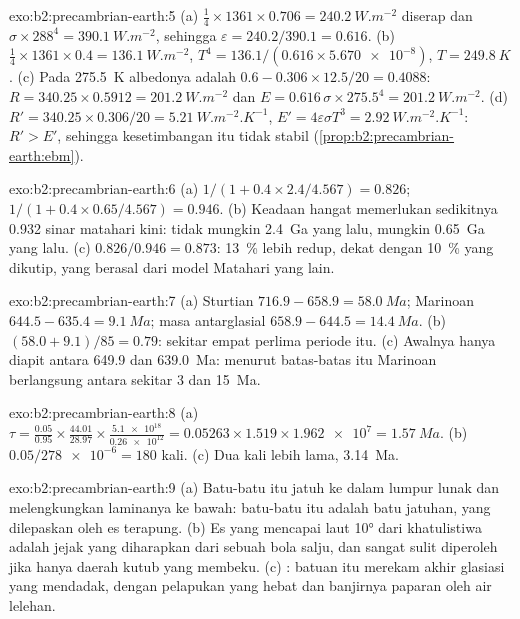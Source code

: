 \begin{solution}{exo:b2:precambrian-earth:5}
(a) $\tfrac14\times1361\times0.706 = \qty{240.2}{W.m^{-2}}$ diserap dan $\sigma\times288^4 =
\qty{390.1}{W.m^{-2}}$, sehingga $\varepsilon = 240.2/390.1 = 0.616$. (b) $\tfrac14\times1361\times0.4
= \qty{136.1}{W.m^{-2}}$, $T^4 = 136.1/(0.616\times\num{5.670e-8})$, $T = \qty{249.8}{K}$.
(c) Pada \qty{275.5}{K} albedonya adalah $0.6 - 0.306\times12.5/20 = 0.4088$: $R = 340.25\times0.5912 =
\qty{201.2}{W.m^{-2}}$ dan $E = 0.616\,\sigma\times275.5^4 = \qty{201.2}{W.m^{-2}}$. (d) $R' =
340.25\times0.306/20 = \qty{5.21}{W.m^{-2}.K^{-1}}$, $E' = 4\varepsilon\sigma T^3 =
\qty{2.92}{W.m^{-2}.K^{-1}}$: $R' > E'$, sehingga kesetimbangan itu tidak stabil
(\cref{prop:b2:precambrian-earth:ebm}).
\end{solution}

\begin{solution}{exo:b2:precambrian-earth:6}
(a) $1/(1 + 0.4\times2.4/4.567) = 0.826$; $1/(1 + 0.4\times0.65/4.567) = 0.946$. (b) Keadaan hangat
memerlukan sedikitnya 0.932 sinar matahari kini: tidak mungkin \qty{2.4}{Ga} yang lalu, mungkin
\qty{0.65}{Ga} yang lalu. (c) $0.826/0.946 = 0.873$: \qty{13}{\percent} lebih redup, dekat dengan
\qty{10}{\percent} yang dikutip, yang berasal dari model Matahari yang lain.
\end{solution}

\begin{solution}{exo:b2:precambrian-earth:7}
(a) Sturtian $716.9 - 658.9 = \qty{58.0}{Ma}$; Marinoan $644.5 - 635.4 = \qty{9.1}{Ma}$;
masa antarglasial $658.9 - 644.5 = \qty{14.4}{Ma}$. (b) $(58.0 + 9.1)/85 = 0.79$: sekitar empat perlima
periode itu. (c) Awalnya hanya diapit antara 649.9 dan \qty{639.0}{Ma}: menurut batas-batas
itu Marinoan berlangsung antara sekitar 3 dan \qty{15}{Ma}.
\end{solution}

\begin{solution}{exo:b2:precambrian-earth:8}
(a) $\tau = \frac{0.05}{0.95}\times\frac{44.01}{28.97}\times\frac{\num{5.1e18}}{\num{0.26e12}} =
0.05263\times1.519\times\num{1.962e7} = \qty{1.57}{Ma}$. (b) $0.05/\num{278e-6} = 180$ kali.
(c) Dua kali lebih lama, \qty{3.14}{Ma}.
\end{solution}

\begin{solution}{exo:b2:precambrian-earth:9}
(a) Batu-batu itu jatuh ke dalam lumpur lunak dan melengkungkan laminanya ke bawah: batu-batu itu adalah batu jatuhan, yang dilepaskan oleh
es terapung. (b) Es yang mencapai laut \ang{10} dari khatulistiwa adalah jejak yang diharapkan dari sebuah
bola salju, dan sangat sulit diperoleh jika hanya daerah kutub yang membeku. (c) :
batuan itu merekam akhir glasiasi yang mendadak, dengan pelapukan yang hebat dan banjirnya
paparan oleh air lelehan.
\end{solution}

